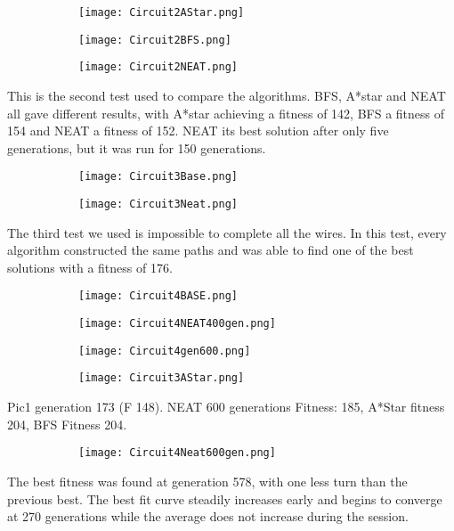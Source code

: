 \documentclass{kththesis}
\begin{document}
\begin{figure}[h]
\begin{subfigure}{0.3\textwidth}
\texttt{[image: Circuit2AStar.png]}
\end{subfigure}
\begin{subfigure}{0.3\textwidth}
\texttt{[image: Circuit2BFS.png]}
\end{subfigure}
\begin{subfigure}{0.3\textwidth}
\texttt{[image: Circuit2NEAT.png]}
\end{subfigure}
\end{figure}
This is the second test used to compare the algorithms. BFS, A*star and NEAT all gave different results, with A*star achieving a fitness of 142, BFS a fitness of 154 and NEAT a fitness of 152. NEAT its best solution after only five generations, but it was run for 150 generations.


\begin{figure}[h]
\begin{subfigure}{0.5\textwidth}
\texttt{[image: Circuit3Base.png]}
\end{subfigure}
\begin{subfigure}{0.5\textwidth}
\texttt{[image: Circuit3Neat.png]}
\end{subfigure}
\end{figure}
The third test we used is impossible to complete all the wires. In this test, every algorithm constructed the same paths and was able to find one of the best solutions with a fitness of 176.


\begin{figure}[h]
\begin{subfigure}{0.25\textwidth}
\texttt{[image: Circuit4BASE.png]}
\end{subfigure}
\begin{subfigure}{0.25\textwidth}
\texttt{[image: Circuit4NEAT400gen.png]}
\end{subfigure}
\begin{subfigure}{0.25\textwidth}
\texttt{[image: Circuit4gen600.png]}
\end{subfigure}
\begin{subfigure}{0.25\textwidth}
\texttt{[image: Circuit3AStar.png]}
\end{subfigure}
\end{figure}
Pic1 generation 173 (F 148). NEAT 600 generations Fitness: 185, A*Star fitness 204, BFS Fitness 204.

\begin{figure}[h]
\begin{subfigure}{0.5\textwidth}
\texttt{[image: Circuit4Neat600gen.png]}
\end{subfigure}
\end{figure}
The best fitness was found at generation 578, with one less turn than the previous best. The best fit curve steadily increases early and begins to converge at 270 generations while the average does not increase during the session. 
\end{document}
